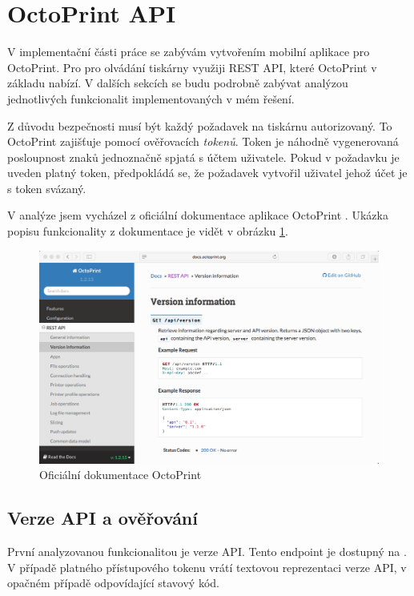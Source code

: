 \section{OctoPrint API}\label{analyza-api}

V implementační části práce se zabývám vytvořením mobilní aplikace pro OctoPrint.
Pro pro olvádání tiskárny využiji REST API, které OctoPrint v základu nabízí.
V dalších sekcích se budu podrobně zabývat analýzou jednotlivých funkcionalit implementovaných v mém řešení.

Z důvodu bezpečnosti musí být každý požadavek na tiskárnu autorizovaný.
To OctoPrint zajišťuje pomocí ověřovacích \textit{tokenů}.
Token je náhodně vygenerovaná posloupnost znaků jednoznačně spjatá s účtem uživatele.
Pokud v požadavku je uveden platný token, předpokládá se, že požadavek vytvořil uživatel jehož účet je s token svázaný.

V analýze jsem vycházel z oficiální dokumentace aplikace OctoPrint \cite{octoprint-docs}.
Ukázka popisu funkcionality z dokumentace je vidět v obrázku \ref{fig:octoprint-docs}.

\begin{figure}\centering
	\includegraphics[width=\textwidth]{assets/analysis-octoprintapi-web.png}
	\caption{Oficiální dokumentace OctoPrint}\label{fig:octoprint-docs}
\end{figure}

\subsection{Verze API a ověřování}

První analyzovanou funkcionalitou je verze API.
Tento endpoint je dostupný na .
V případě platného přístupového tokenu vrátí textovou reprezentaci verze API, v opačném případě odpovídající stavový kód.

